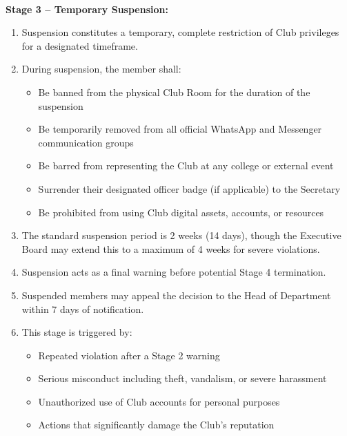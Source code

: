 \\
\textbf{Stage 3 -- Temporary Suspension:}
\begin{enumerate}[label=\alph*), leftmargin=2em, itemsep=0.3em]
    \item Suspension constitutes a temporary, complete restriction of Club privileges for a designated timeframe.
    
    \item During suspension, the member shall:
    \begin{itemize}[leftmargin=1.5em, itemsep=0.2em]
        \item Be banned from the physical Club Room for the duration of the suspension
        \item Be temporarily removed from all official WhatsApp and Messenger communication groups
        \item Be barred from representing the Club at any college or external event
        \item Surrender their designated officer badge (if applicable) to the Secretary
        \item Be prohibited from using Club digital assets, accounts, or resources
    \end{itemize}
    
    \item The standard suspension period is 2 weeks (14 days), though the Executive Board may extend this to a maximum of 4 weeks for severe violations.
    
    \item Suspension acts as a final warning before potential Stage 4 termination.
    
    \item Suspended members may appeal the decision to the Head of Department within 7 days of notification.
    
    \item This stage is triggered by:
    \begin{itemize}[leftmargin=1.5em, itemsep=0.2em]
        \item Repeated violation after a Stage 2 warning
        \item Serious misconduct including theft, vandalism, or severe harassment
        \item Unauthorized use of Club accounts for personal purposes
        \item Actions that significantly damage the Club's reputation
    \end{itemize}
\end{enumerate}
